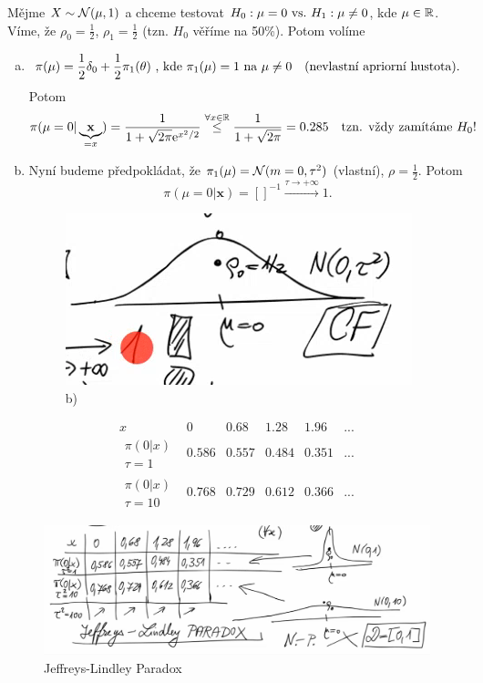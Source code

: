 \begin{example}
	Mějme $X\sim\mathcal{N}(\mu,1)$ a chceme testovat $H_0: \mu=0 ~\text{vs.}~ H_1: \mu\neq0$, kde $\mu\in\mathbb{R}$. Víme, že $\rho_0=\frac{1}{2}$, $\rho_1=\frac{1}{2}$ (tzn. $H_0$ věříme na 50\%). Potom volíme
	\begin{enumerate}[a)]
		\item $$ \pi(\mu)=\frac{1}{2}\delta_0+\frac{1}{2}\pi_1(\theta)\text{ , kde }\pi_1(\mu)=1\text{ na }\mu\neq0\quad(\text{nevlastní apriorní hustota}).$$
		Potom $$ \pi(\mu=0|\underbrace{\textbf{x}}_{=x})=\frac{1}{1+\sqrt{2\pi} \mathrm{e}^{x^2/2}}\stackrel{\forall x\in\mathbb{R}}{\leq}\frac{1}{1+\sqrt{2\pi}}=0.285\quad \text{tzn. vždy zamítáme }H_0!$$
		\item Nyní budeme předpokládat, že $\pi_1(\mu)=\mathcal{N}(m=0,\tau^2)$ (vlastní), $\rho=\frac{1}{2}$. Potom $$\pi(\mu=0|\textbf{x})=[]^{-1}\stackrel{\tau\to+\infty}{\longrightarrow}1.$$
		\begin{figure}[h]
			\centering
			\includegraphics[width=0.5\linewidth]{pictures/last01}
			\caption{b)}
			\label{fig:last01}
		\end{figure}
		
	\end{enumerate}
$$ \begin{array}{c|c|c|c|c|c}
x & 0 & 0.68 & 1.28 & 1.96 & ... \\\hline
\substack{\pi(0|x)\\ \tau=1}& 0.586 & 0.557 & 0.484 & 0.351 & ... \\\hline
\substack{\pi(0|x)\\ \tau=10}& 0.768 & 0.729 & 0.612 & 0.366 & ...
\end{array}
 $$
\end{example}
\begin{figure}[h]
	\centering
	\includegraphics[width=0.8\linewidth]{pictures/last02}
	\caption{Jeffreys-Lindley Paradox}
	\label{fig:last02}
\end{figure}
